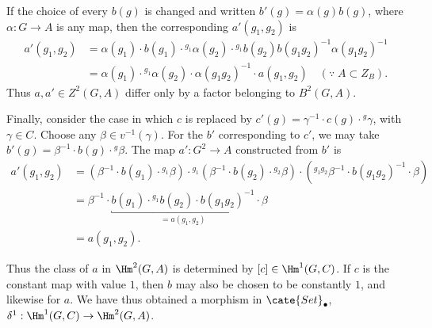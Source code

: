 If the choice of every $b(g)$ is changed and written
$b'(g)=\alpha(g)b(g)$, where $\alpha:G\to A$ is any map, then the
corresponding $a'(g_1,g_2)$ is
\begin{align*}
	a'(g_1, g_2) & = \alpha(g_1) \cdot b(g_1) \cdot {}^{g_1} \alpha(g_2) \cdot {}^{g_1} b(g_2) b(g_1 g_2)^{-1} \alpha(g_1 g_2)^{-1} \\
	& = \alpha(g_1) \cdot {}^{g_1} \alpha(g_2) \cdot \alpha(g_1 g_2)^{-1} \cdot a(g_1, g_2) \quad (\because\; A \subset Z_B).
\end{align*}
Thus $a,a'\in Z^2(G,A)$ differ only by a factor belonging to $B^2(G,A)$.

Finally, consider the case in which $c$ is replaced by
$c'(g)=\gamma^{-1}\cdot c(g)\cdot{}^g\gamma$, with $\gamma\in C$. Choose
any $\beta\in v^{-1}(\gamma)$. For the $b'$ corresponding to $c'$, we may
take $b'(g)=\beta^{-1}\cdot b(g)\cdot{}^g\beta$. The map $a':G^2\to A$
constructed from $b'$ is
\begin{align*}
	a'(g_1, g_2) & = \left( \beta^{-1} \cdot b(g_1) \cdot {}^{g_1} \beta \right) \cdot {}^{g_1} \left( \beta^{-1} \cdot b(g_2) \cdot {}^{g_2} \beta \right) \cdot \left( {}^{g_1 g_2} \beta^{-1} \cdot b(g_1 g_2)^{-1} \cdot \beta \right) \\
	& = \beta^{-1} \cdot \underbracket{b(g_1) \cdot {}^{g_1} b(g_2) \cdot b(g_1 g_2)^{-1}}_{= a(g_1, g_2)} \cdot \beta \\
	& = a(g_1, g_2).
\end{align*}

Thus the class of $a$ in $\Hm^2(G,A)$ is determined by
$[c]\in\Hm^1(G,C)$. If $c$ is the constant map with value $1$, then $b$
may also be chosen to be constantly $1$, and likewise for $a$. We have thus
obtained a morphism in $\cate{Set}_\bullet$,
$\delta^1:\Hm^1(G,C)\to\Hm^2(G,A)$.

